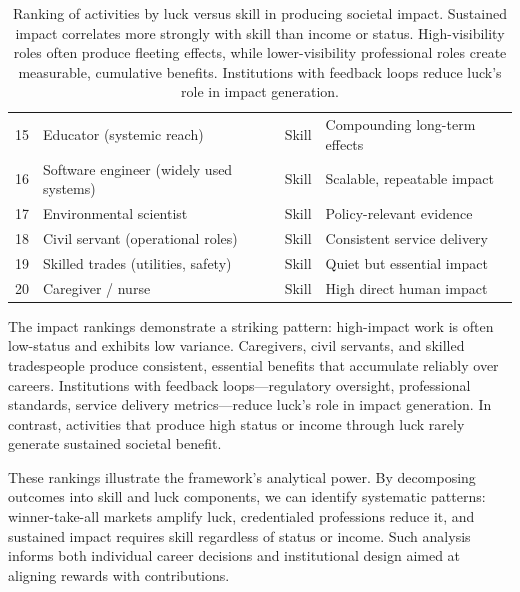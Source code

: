\begin{table}[H]
\begin{tabular}{clll}
    15                     & Educator (systemic reach)               & Skill                  & Compounding long-term effects       \\
    16                     & Software engineer (widely used systems) & Skill                  & Scalable, repeatable impact         \\
    17                     & Environmental scientist                 & Skill                  & Policy-relevant evidence            \\
    18                     & Civil servant (operational roles)       & Skill                  & Consistent service delivery         \\
    19                     & Skilled trades (utilities, safety)      & Skill                  & Quiet but essential impact          \\
    20                     & Caregiver / nurse                       & Skill                  & High direct human impact            \\
    \bottomrule
  \end{tabular}
  \caption{Ranking of activities by luck versus skill in producing
  societal impact. Sustained impact correlates more strongly with skill than
  income or status. High-visibility roles often produce fleeting effects,
  while lower-visibility professional roles create measurable,
  cumulative benefits. Institutions with feedback loops reduce luck's role
  in impact generation.}
  \label{tab:impact_rankings}
\end{table}

The impact rankings demonstrate a striking pattern: high-impact work is
often low-status and exhibits low variance. Caregivers, civil servants, and
skilled tradespeople produce consistent, essential benefits that
accumulate reliably over careers. Institutions with feedback loops—regulatory
oversight, professional standards, service delivery metrics—reduce luck's
role in impact generation. In contrast, activities that produce high status
or income through luck rarely generate sustained societal benefit.

These rankings illustrate the framework's analytical power. By
decomposing outcomes into skill and luck components, we can identify systematic
patterns: winner-take-all markets amplify luck, credentialed professions
reduce it, and sustained impact requires skill regardless of status or
income. Such analysis informs both individual career decisions and institutional
design aimed at aligning rewards with contributions.


